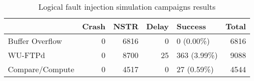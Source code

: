 \begin{table}[H]
\centering
\caption{Logical fault injection simulation campaigns results}
\label{table:end_sim_by_status_wop_multi_bitflip_reg_multi}
\begin{tabular}{lrrrlr}
\toprule
 & Crash & NSTR & Delay & Success & Total \\
\midrule
Buffer Overflow & 0 & 6816 & 0 & 0 (0.00\%) & 6816 \\
WU-FTPd & 0 & 8700 & 25 & 363 (3.99\%) & 9088 \\
Compare/Compute & 0 & 4517 & 0 & 27 (0.59\%) & 4544 \\
\bottomrule
\end{tabular}
\end{table}
